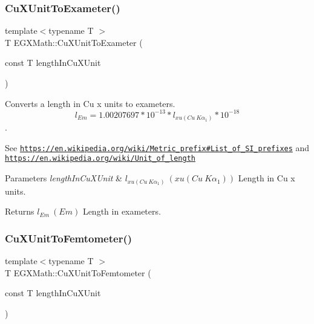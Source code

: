 \subsubsection{\texorpdfstring{Cu\+X\+Unit\+To\+Exameter()}{CuXUnitToExameter()}}
{\footnotesize\ttfamily template$<$typename T $>$ \\
T E\+G\+X\+Math\+::\+Cu\+X\+Unit\+To\+Exameter (\begin{DoxyParamCaption}\item[{const T}]{length\+In\+Cu\+X\+Unit }\end{DoxyParamCaption})}



Converts a length in Cu x units to exameters. \[ l_{Em}=1.00207697*10^{-13} * l_{xu(Cu\ K\alpha_1)} * 10^{-18} \]. 

See \href{https://en.wikipedia.org/wiki/Metric_prefix#List_of_SI_prefixes}{\tt https\+://en.\+wikipedia.\+org/wiki/\+Metric\+\_\+prefix\#\+List\+\_\+of\+\_\+\+S\+I\+\_\+prefixes} and \href{https://en.wikipedia.org/wiki/Unit_of_length}{\tt https\+://en.\+wikipedia.\+org/wiki/\+Unit\+\_\+of\+\_\+length} 
\begin{DoxyParams}{Parameters}
{\em length\+In\+Cu\+X\+Unit} & $ l_{xu(Cu\ K\alpha_1)}\ (xu(Cu\ K\alpha_1))$ Length in Cu x units. \\
\hline
\end{DoxyParams}
\begin{DoxyReturn}{Returns}
$ l_{Em}\ (Em)$ Length in exameters. 
\end{DoxyReturn}
\mbox{\label{group___e_g_x_math-_conversions-_length_conversions-_non-_s_i-_cu_x_unit-_s_i_ga421b3a85685a8e55cc82e2b268388fca}} 
\subsubsection{\texorpdfstring{Cu\+X\+Unit\+To\+Femtometer()}{CuXUnitToFemtometer()}}
{\footnotesize\ttfamily template$<$typename T $>$ \\
T E\+G\+X\+Math\+::\+Cu\+X\+Unit\+To\+Femtometer (\begin{DoxyParamCaption}\item[{const T}]{length\+In\+Cu\+X\+Unit }\end{DoxyParamCaption})}



